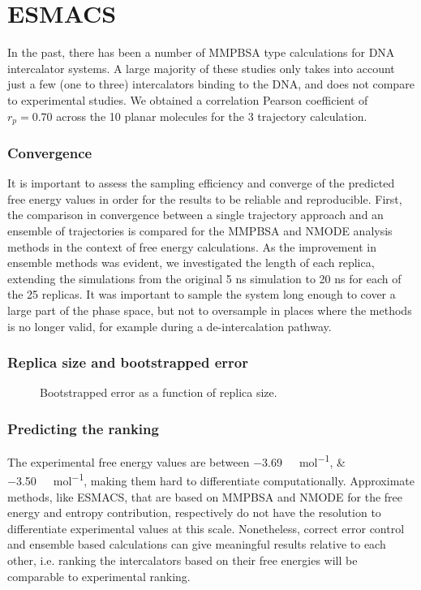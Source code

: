 \section{ESMACS}

In the past, there has been a number of MMPBSA type calculations for DNA intercalator systems. A large majority of these studies only takes into account just a few (one to three) intercalators binding to the DNA, and does not compare to experimental studies. We obtained a correlation Pearson coefficient of $r_p=0.70$ across the 10 planar molecules for the 3 trajectory calculation.

\subsubsection{Convergence}

It is important to assess the sampling efficiency and converge of the predicted free energy values in order for the results to be reliable and reproducible.
First, the comparison in convergence between a single trajectory approach and an ensemble of trajectories is compared for the MMPBSA and NMODE analysis methods in the context of free energy calculations. As the improvement in ensemble methods was evident, we investigated the length of each replica, extending the simulations from the original 5 ns simulation to 20 ns for each of the 25 replicas. It was important to sample the system long enough to cover a large part of the phase space, but not to oversample in places where the methods is no longer valid, for example during a de-intercalation pathway.

\subsubsection{Replica size and bootstrapped error}



\begin{figure}
  
  \caption{Bootstrapped error as a function of replica size. }
  \label{fig:bootstrap}
\end{figure}

\subsubsection{Predicting the ranking}

The experimental free energy values are between \SIlist{-3.69;-3.50}{\kilo\calorie\per\mole}, making them hard to differentiate computationally. Approximate methods, like ESMACS, that are based on MMPBSA and NMODE for the free energy and entropy contribution, respectively do not have the resolution to differentiate experimental values at this scale. Nonetheless, correct error control and ensemble based calculations can give meaningful results relative to each other, i.e. ranking the intercalators based on their free energies will be comparable to experimental ranking.

